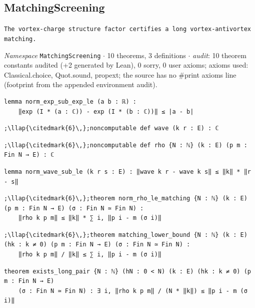 \subsection{MatchingScreening}\label{appA:MatchingScreening}
{\footnotesize\raggedright\texttt{The vortex-\allowbreak{}charge structure factor certifies a long vortex-\allowbreak{}antivortex matching.\allowbreak{}}\par}
{\footnotesize\raggedright\emph{Namespace} \texttt{MatchingScreening} $\cdot$ 10 theorems, 3 definitions $\cdot$ \emph{audit}: 10 theorem constants audited (+2 generated by Lean), 0 sorry, 0 user axioms; axioms used: Classical.choice, Quot.sound, propext; the source has no \#print axioms line (footprint from the appended environment audit).\par}
\vspace{1pt}
\begin{lstlisting}[style=leancat]
lemma norm_exp_sub_exp_le (a b : ℝ) :
    ‖exp (I * (a : ℂ)) - exp (I * (b : ℂ))‖ ≤ |a - b|
\end{lstlisting}

\begin{lstlisting}[style=leancat]
;\llap{\citedmark{6}\,};noncomputable def wave (k r : E) : ℂ
\end{lstlisting}

\begin{lstlisting}[style=leancat]
;\llap{\citedmark{6}\,};noncomputable def rho {N : ℕ} (k : E) (p m : Fin N → E) : ℂ
\end{lstlisting}

\begin{lstlisting}[style=leancat]
lemma norm_wave_sub_le (k r s : E) : ‖wave k r - wave k s‖ ≤ ‖k‖ * ‖r - s‖
\end{lstlisting}

\begin{lstlisting}[style=leancat]
;\llap{\citedmark{6}\,};theorem norm_rho_le_matching {N : ℕ} (k : E) (p m : Fin N → E) (σ : Fin N ≃ Fin N) :
    ‖rho k p m‖ ≤ ‖k‖ * ∑ i, ‖p i - m (σ i)‖
\end{lstlisting}

\begin{lstlisting}[style=leancat]
;\llap{\citedmark{6}\,};theorem matching_lower_bound {N : ℕ} (k : E) (hk : k ≠ 0) (p m : Fin N → E) (σ : Fin N ≃ Fin N) :
    ‖rho k p m‖ / ‖k‖ ≤ ∑ i, ‖p i - m (σ i)‖
\end{lstlisting}

\begin{lstlisting}[style=leancat]
theorem exists_long_pair {N : ℕ} (hN : 0 < N) (k : E) (hk : k ≠ 0) (p m : Fin N → E)
    (σ : Fin N ≃ Fin N) : ∃ i, ‖rho k p m‖ / (N * ‖k‖) ≤ ‖p i - m (σ i)‖
\end{lstlisting}

